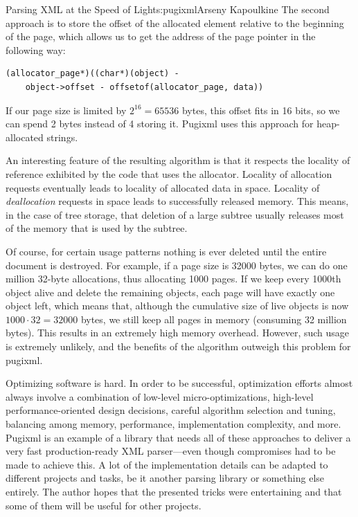 \begin{aosachapter}{Parsing XML at the Speed of Light}{s:pugixml}{Arseny Kapoulkine}
The second approach is to store the offset of the allocated element
relative to the beginning of the page, which allows us to get the
address of the page pointer in the following way:

\begin{verbatim}
(allocator_page*)((char*)(object) -
    object->offset - offsetof(allocator_page, data))
\end{verbatim}

\noindent If our page size is limited by $2^{16} = 65536$ bytes, this
offset fits in 16 bits, so we can spend 2 bytes instead of 4 storing it.
Pugixml uses this approach for heap-allocated strings.

An interesting feature of the resulting algorithm is that it respects
the locality of reference exhibited by the code that uses the allocator.
Locality of allocation requests eventually leads to locality of
allocated data in space. Locality of \emph{deallocation} requests in
space leads to successfully released memory. This means, in the case of
tree storage, that deletion of a large subtree usually releases most of
the memory that is used by the subtree.

Of course, for certain usage patterns nothing is ever deleted until the
entire document is destroyed. For example, if a page size is 32000
bytes, we can do one million 32-byte allocations, thus allocating 1000
pages. If we keep every 1000th object alive and delete the remaining
objects, each page will have exactly one object left, which means that,
although the cumulative size of live objects is now
$1000 \cdot 32 = 32000$ bytes, we still keep all pages in memory
(consuming 32 million bytes). This results in an extremely high memory
overhead. However, such usage is extremely unlikely, and the benefits of
the algorithm outweigh this problem for pugixml.


Optimizing software is hard. In order to be successful, optimization
efforts almost always involve a combination of low-level
micro-optimizations, high-level performance-oriented design decisions,
careful algorithm selection and tuning, balancing among memory,
performance, implementation complexity, and more. Pugixml is an example
of a library that needs all of these approaches to deliver a very fast
production-ready XML parser---even though compromises had to be made to
achieve this. A lot of the implementation details can be adapted to
different projects and tasks, be it another parsing library or something
else entirely. The author hopes that the presented tricks were
entertaining and that some of them will be useful for other projects.

\end{aosachapter}
